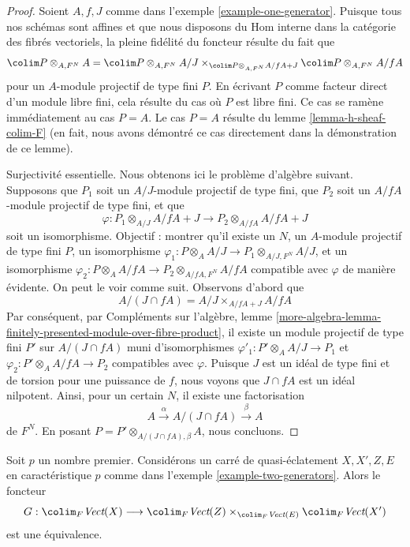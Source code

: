 \begin{proof}
Soient $A, f, J$ comme dans l'exemple \ref{example-one-generator}.
Puisque tous nos schémas sont affines et que nous disposons du
Hom interne dans la catégorie des fibrés vectoriels, la pleine fidélité
du foncteur résulte du fait que
$$
\colim P \otimes_{A, F^N} A =
\colim P \otimes_{A, F^N} A/J
\times_{\colim P \otimes_{A, F^N} A/fA + J}
\colim P \otimes_{A, F^N} A/fA
$$
pour un $A$-module projectif de type fini $P$. En écrivant $P$ comme facteur direct
d'un module libre fini, cela résulte du cas où $P$ est libre
fini. Ce cas se ramène immédiatement au cas $P = A$. Le cas
$P = A$ résulte du lemme \ref{lemma-h-sheaf-colim-F}
(en fait, nous avons démontré ce cas directement dans la démonstration de ce lemme).

\medskip\noindent
Surjectivité essentielle. Nous obtenons ici le problème d'algèbre suivant.
Supposons que $P_1$ soit un $A/J$-module projectif de type fini,
que $P_2$ soit un $A/fA$-module projectif de type fini, et que
$$
\varphi :
P_1 \otimes_{A/J} A/fA + J
\longrightarrow
P_2 \otimes_{A/fA} A/fA + J
$$
soit un isomorphisme. Objectif : montrer qu'il existe un $N$, un
$A$-module projectif de type fini $P$, un isomorphisme
$\varphi_1 : P \otimes_A A/J \to P_1 \otimes_{A/J, F^N} A/J$,
et un isomorphisme
$\varphi_2 : P \otimes_A A/fA \to P_2 \otimes_{A/fA, F^N} A/fA$
compatible avec $\varphi$ de manière évidente.
On peut le voir comme suit. Observons d'abord que
$$
A/(J \cap fA) = A/J \times_{A/fA + J} A/fA
$$
Par conséquent, par Compléments sur l'algèbre, lemme
\ref{more-algebra-lemma-finitely-presented-module-over-fibre-product},
il existe un module projectif de type fini $P'$ sur
$A/(J \cap fA)$ muni d'isomorphismes
$\varphi'_1 : P' \otimes_A A/J \to P_1$ et
$\varphi_2 : P' \otimes_A A/fA \to P_2$
compatibles avec $\varphi$. Puisque $J$ est un idéal de type fini et
de torsion pour une puissance de $f$, nous voyons que $J \cap fA$ est un
idéal nilpotent. Ainsi, pour un certain $N$, il existe une factorisation
$$
A \xrightarrow{\alpha} A/(J \cap fA) \xrightarrow{\beta} A
$$
de $F^N$. En posant $P = P' \otimes_{A/(J \cap fA), \beta} A$,
nous concluons.
\end{proof}

\begin{lemma}
\label{lemma-vector-bundle-II}
Soit $p$ un nombre premier. Considérons un carré de quasi-éclatement $X, X', Z, E$
en caractéristique $p$ comme dans l'exemple \ref{example-two-generators}.
Alors le foncteur
$$
G :
\colim_F \textit{Vect}(X)
\longrightarrow
\colim_F \textit{Vect}(Z)
\times_{\colim_F \textit{Vect}(E)}
\colim_F \textit{Vect}(X')
$$
est une équivalence.
\end{lemma}

